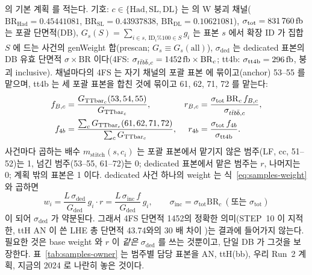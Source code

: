  의 기본 계획  를 적는다. 기호: $c\in\{\mathrm{Had},\mathrm{SL},\mathrm{DL}\}$
는 \ttbar 의 W 붕괴 채널($\mathrm{BR}_{\mathrm{Had}}=0.45441081$, $\mathrm{BR}_{\mathrm{SL}}=0.43937838$, $\mathrm{BR}_{\mathrm{DL}}=0.10621081$), $\sigma_{\mathrm{tot}}=831\,760\,\mathrm{fb}$ 는
포괄 \ttbar 단면적(DB), $G_s(S)=\sum_{i\in s,\ \mathrm{ID}_i\%100\in S}g_i$ 는 표본 $s$ 에서 확장 ID 가 집합 $S$ 에 드는 사건의 genWeight 합(prescan; $G_s\equiv G_s(\mathrm{all})$),
$\sigma_{\mathrm{ded}}$ 는 dedicated 표본의 DB 유효 단면적 $\sigma\times\mathrm{BR}$ 이다(4FS: $\sigma_{t\bar{t}b\bar{b},c}=1452\,\mathrm{fb}\times\mathrm{BR}_c$; tt4b: $\sigma_{\mathrm{tt4b}}=296\,\mathrm{fb}$, 붕괴
inclusive). 채널마다의 4FS \ttbb 는 자기 채널의 포괄 표본  에 묶이고(anchor) 53--55 를 맡으며, tt4b 는 세 포괄 표본을 합친 것에 묶이고 61, 62, 71, 72 를
맡는다:
\begin{align}
  f_{B,c} &= \frac{G_{\mathrm{TTbar}_c}(53,54,55)}{G_{\mathrm{TTbar}_c}}, &
  r_{B,c} &= \frac{\sigma_{\mathrm{tot}}\,\mathrm{BR}_c\,f_{B,c}}{\sigma_{t\bar{t}b\bar{b},c}}, \label{eq:samples-rB}\\
  f_{4b}  &= \frac{\sum_c G_{\mathrm{TTbar}_c}(61,62,71,72)}{\sum_c G_{\mathrm{TTbar}_c}}, &
  r_{4b}  &= \frac{\sigma_{\mathrm{tot}}\,f_{4b}}{\sigma_{\mathrm{tt4b}}}. \label{eq:samples-r4b}
\end{align}
사건마다 곱하는 배수 $m_{\mathrm{stitch}}(s,c_i)$ 는 포괄 표본에서 맡기지 않은 범주(LF, cc, 51--52)는 1, 넘긴 범주(53--55, 61--72)는 0; dedicated 표본에서 맡은 범주는
$r$, 나머지는 0; 계획 밖의 표본은 1 이다. dedicated 사건 하나의 weight 는 식~\eqref{eq:samples-weight} 와 곱하면
\begin{equation}
  w_i = \frac{L\,\sigma_{\mathrm{ded}}}{G_{\mathrm{ded}}}\,g_i\cdot r = \frac{L\,\sigma_{\mathrm{inc}}\,f}{G_{\mathrm{ded}}}\,g_i,
  \qquad \sigma_{\mathrm{inc}}=\sigma_{\mathrm{tot}}\mathrm{BR}_c\ (\text{또는 }\sigma_{\mathrm{tot}})
  \label{eq:samples-dedw}
\end{equation}
이 되어 $\sigma_{\mathrm{ded}}$ 가 약분된다. 그래서 4FS 단면적 1452\fb 의 정확한 의미(STEP~10 이 지적한, ttH AN 이 쓴 LHE 총 단면적 43.74\pb 와의 30 배 차이
)는 결과에 들어가지 않는다. 필요한 것은 base weight 와 $r$ 이 \emph{같은} $\sigma_{\mathrm{ded}}$ 를 쓰는 것뿐이고,
단일 DB 가 그것을 보장한다. 표~\ref{tab:samples-owner} 는 범주별 담당 표본을 AN, ttH(bb), 우리 Run~2 계획, 지금의 2024 로 나란히 놓은 것이다.


